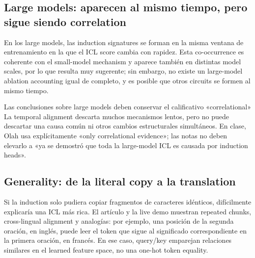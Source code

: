 \subsection{Large models: aparecen al mismo tiempo, pero sigue siendo correlation}

En los large models, las induction signatures se forman en la misma ventana de entrenamiento en la que el ICL score cambia con rapidez. Esta co-occurrence es coherente con el small-model mechanism y aparece también en distintas model scales, por lo que resulta muy sugerente; sin embargo, no existe un large-model ablation accounting igual de completo, y es posible que otros circuits se formen al mismo tiempo.


\begin{warningbox}{Las conclusiones sobre large models deben conservar el calificativo «correlational»}
La temporal alignment descarta muchos mecanismos lentos, pero no puede descartar una causa común ni otros cambios estructurales simultáneos. En clase, Olah usa explícitamente «only correlational evidence»; las notas no deben elevarlo a «ya se demostró que toda la large-model ICL es causada por induction heads».
\end{warningbox}


\subsection{Generality: de la literal copy a la translation}

Si la induction solo pudiera copiar fragmentos de caracteres idénticos, difícilmente explicaría una ICL más rica. El artículo y la live demo muestran repeated chunks, cross-lingual alignment y analogías: por ejemplo, una posición de la segunda oración, en inglés, puede leer el token que sigue al significado correspondiente en la primera oración, en francés. En ese caso, query/key emparejan relaciones similares en el learned feature space, no una one-hot token equality.


